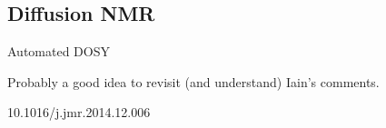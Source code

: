 \subsection{Diffusion NMR}
\label{subsec:poise__diffusion}

Automated DOSY

Probably a good idea to revisit (and understand) Iain's comments.

10.1016/j.jmr.2014.12.006
